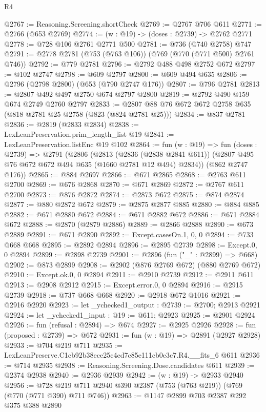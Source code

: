 \begin{lexlean}{R4}
\begin{coremodule}
@2767 := Reasoning.Screening.shortCheck
@2769 := @2767 @706 @611
@2771 := @2766 (@653 @2769)
@2774 := (w : @19) -> (doses : @2739) -> @2762 @2771
@2778 := @728 @106 @2761 @2771 @500
@2781 := @736 (@740 @2758) @747
@2791 := @2778 @2781 (@753 (@763 @106)) (@769 (@770 (@771 @500) @2761 @746))
@2792 := @779 @2781
@2796 := @2792 @488 @498 @2752 @672
@2797 := @102 @2747
@2798 := @609 @2797
@2800 := @609 @494 @635
@2806 := @2796 (@2798 @2800) (@653 (@790 @2747 @176))
@2807 := @796 @2781
@2813 := @2807 @492 @497 @2750 @674 @2797 @2800
@2819 := @2792 @490 @159 @674 @2749 @2760 @2797
@2833 := @2807 @88 @76 @672 @672 @2758 @635 (@818 @2781 @25 @2758 (@823 (@824 @2781 @25)))
@2834 := @837 @2781
@2836 := @2819 (@2833 @2834)
@2838 := LexLeanPreservation.prim_length_list @19
@2841 := LexLeanPreservation.listEnc @19 @102
@2864 := fun (w : @19) =>
  fun (doses : @2739) =>
  @2791
    (@2806
      (@2813
        (@2836 (@2838 @2841 @611))
        (@2807 @495 @76 @672 @672 @494 @635 (@1660 @2781 @12 @494) @2834))
      (@862 @2747 @176))
@2865 := @884 @2697
@2866 := @671 @2865
@2868 := @2763 @611 @2700
@2869 := @676 @2868
@2870 := @671 @2869
@2872 := @2767 @611 @2700
@2873 := @876 @2872
@2874 := @2873 @672
@2875 := @874 @2874
@2877 := @880 @2872 @672
@2879 := @2875 @2877 @885
@2880 := @884 @885
@2882 := @671 @2880 @672
@2884 := @671 @2882 @672
@2886 := @671 @2884 @672
@2888 := @2870 (@2879 @2886)
@2889 := @2866 @2888
@2890 := @673 @2889
@2891 := @671 @2890
@2892 := Except.casesOn.{1, 0, 0}
@2894 := @733 @668 @668
@2895 := @2892 @2894
@2896 := @2895 @2739
@2898 := Except.{0, 0} @2894
@2899 := @2898 @2739
@2901 := @2896 (fun ("_" : @2899) => @668)
@2902 := @873 @2899
@2908 := @2902 (@876 @2769 @672) (@880 @2769 @672)
@2910 := Except.ok.{0, 0} @2894
@2911 := @2910 @2739
@2912 := @2911 @611
@2913 := @2908 @2912
@2915 := Except.error.{0, 0} @2894
@2916 := @2915 @2739
@2918 := @737 @668 @668
@2920 := @2918 @672 @1016
@2921 := @2916 @2920
@2923 := let _ychecked1_output : @2739 := @2700; @2913 @2921
@2924 := let _ychecked1_input : @19 := @611; @2923
@2925 := @2901 @2924
@2926 := fun (refusal : @2894) => @674
@2927 := @2925 @2926
@2928 := fun (proposed : @2739) => @672
@2931 := fun (w : @19) => @2891 (@2927 @2928)
@2933 := @704 @219 @711
@2935 := LexLeanPreserve.C1cb92b38ece25c4cd7c85e111cb0e3c7.R4.__fits_6 @611
@2936 := @714 @2935
@2938 := Reasoning.Screening.Dose.candidates @611
@2939 := @2374 @2938
@2940 := @2936 @2939
@2942 := (w : @19) -> @2933 @2940
@2956 := @728 @219 @711 @2940 @390 @2387 (@753 (@763 @219)) (@769 (@770 (@771 @390) @711 @746))
@2963 := @1147 @2899 @703 @2387 @292 @375 @388 @2890

\end{coremodule}
\end{lexlean}
